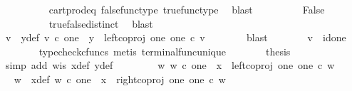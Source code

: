 \begin{isabellebody}
\ \ \ \ \ \ \ \ \isamarkupfalse%
\ cart{\isacharunderscore}{\kern0pt}prod{\isacharunderscore}{\kern0pt}eq{}\ false{\isacharunderscore}{\kern0pt}func{\isacharunderscore}{\kern0pt}type\ true{\isacharunderscore}{\kern0pt}func{\isacharunderscore}{\kern0pt}type\ \isamarkupfalse%
\ blast\isanewline
\ \ \ \ \ \ \isamarkupfalse%
\ \isamarkupfalse%
\ False\isanewline
\ \ \ \ \ \ \ \ \isamarkupfalse%
\ true{\isacharunderscore}{\kern0pt}false{\isacharunderscore}{\kern0pt}distinct\ \isamarkupfalse%
\ blast\isanewline
\ \ \ \ \isamarkupfalse%
\isanewline
\ \ \ \ \isamarkupfalse%
\ \isamarkupfalse%
\ v\ \ y{\isacharunderscore}{\kern0pt}def{\isacharcolon}{\kern0pt}\ {\isachardoublequoteopen}v\ {\isasymin}\isactrlsub c\ one\ {\isasymand}\ y\ {\isacharequal}{\kern0pt}\ left{\isacharunderscore}{\kern0pt}coproj\ one\ one\ {\isasymcirc}\isactrlsub c\ v{\isachardoublequoteclose}\isanewline
\ \ \ \ \ \ \isamarkupfalse%
\ blast\isanewline
\ \ \ \ \isamarkupfalse%
\ \isamarkupfalse%
\ {\isachardoublequoteopen}v\ {\isacharequal}{\kern0pt}\ id{\isacharparenleft}{\kern0pt}one{\isacharparenright}{\kern0pt}{\isachardoublequoteclose}\isanewline
\ \ \ \ \ \ \isamarkupfalse%
\ {\isacharparenleft}{\kern0pt}typecheck{\isacharunderscore}{\kern0pt}cfuncs{\isacharcomma}{\kern0pt}\ metis\ terminal{\isacharunderscore}{\kern0pt}func{\isacharunderscore}{\kern0pt}unique{\isacharparenright}{\kern0pt}\isanewline
\ \ \ \ \isamarkupfalse%
\ \isamarkupfalse%
\ {\isacharquery}{\kern0pt}thesis\isanewline
\ \ \ \ \ \ \isamarkupfalse%
\ {\isacharparenleft}{\kern0pt}simp\ add{\isacharcolon}{\kern0pt}\ w{\isacharunderscore}{\kern0pt}is\ x{\isacharunderscore}{\kern0pt}def\ y{\isacharunderscore}{\kern0pt}def{\isacharparenright}{\kern0pt}\isanewline
\ \ \isamarkupfalse%
\isanewline
\ \ \ \ \isamarkupfalse%
\ {\isachardoublequoteopen}{\isasymnexists}w{\isachardot}{\kern0pt}\ w\ {\isasymin}\isactrlsub c\ one\ {\isasymand}\ x\ {\isacharequal}{\kern0pt}\ left{\isacharunderscore}{\kern0pt}coproj\ one\ one\ {\isasymcirc}\isactrlsub c\ w{\isachardoublequoteclose}\isanewline
\ \ \ \ \isamarkupfalse%
\ \isamarkupfalse%
\ w\ \ x{\isacharunderscore}{\kern0pt}def{\isacharcolon}{\kern0pt}\ {\isachardoublequoteopen}w\ {\isasymin}\isactrlsub c\ one\ {\isasymand}\ x\ {\isacharequal}{\kern0pt}\ right{\isacharunderscore}{\kern0pt}coproj\ one\ one\ {\isasymcirc}\isactrlsub c\ w{\isachardoublequoteclose}\isanewline

\end{isabellebody}

